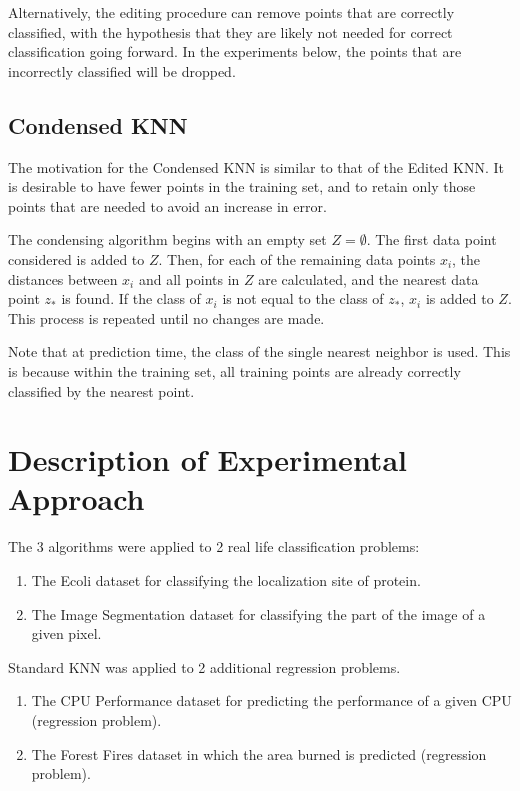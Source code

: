 \documentclass{amsart}
\begin{document}
    Alternatively, the editing procedure can remove points that are correctly classified, with the
    hypothesis that they are likely not needed for correct classification going forward. In the experiments
    below, the points that are incorrectly classified will be dropped.

    \subsection*{Condensed KNN}
    The motivation for the Condensed KNN\cite{condensed_knn} is similar to that of the Edited KNN. It is desirable
    to have fewer points in the training set, and to retain only those points that are needed
    to avoid an increase in error.

    The condensing algorithm begins with an empty set $Z = \emptyset$. The first data point
    considered is added to $Z$. Then, for each of the remaining data points $x_i$,
    the distances between $x_i$ and all points in $Z$ are calculated, and the nearest data point $z_*$
    is found. If the class of $x_i$ is not equal to the class of $z_*$,
    $x_i$ is added to $Z$. This process is repeated until no changes are made.

    Note that at prediction time, the class of the single nearest neighbor is used. This is because
    within the training set, all training points are already correctly classified by the nearest point.

    \section{Description of Experimental Approach}
    The 3 algorithms were applied to 2 real life classification problems:
    \begin{enumerate}
        \item The Ecoli dataset for classifying the localization site of protein.
        \item The Image Segmentation dataset for classifying the part of the image of a given pixel.
    \end{enumerate}
    Standard KNN was applied to 2 additional regression problems.
    \begin{enumerate}
        \item The CPU Performance dataset for predicting the performance of a given CPU (regression problem).
        \item The Forest Fires dataset in which the area burned is predicted (regression problem).
    \end{enumerate}
\end{document}
